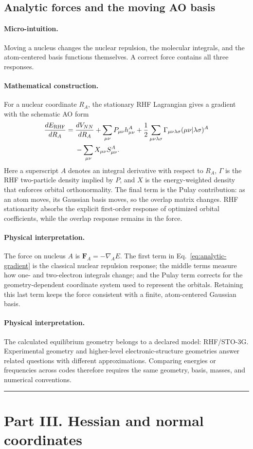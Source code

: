 \documentclass[10pt,twocolumn]{article}
\newcommand{\conceptbreak}{%
  \par\medskip\noindent
  {\color{black!30}\rule{\columnwidth}{0.35pt}}%
  \par\medskip}
\newcommand{\micro}{\paragraph{Micro-intuition.}}
\newcommand{\mathderiv}{\paragraph{Mathematical construction.}}
\newcommand{\physical}{\paragraph{Physical interpretation.}}
\begin{document}
\subsection*{Analytic forces and the moving AO basis}

\micro Moving a nucleus changes the nuclear repulsion, the molecular
integrals, and the atom-centered basis functions themselves.  A correct force
contains all three responses.

\mathderiv For a nuclear coordinate $R_A$, the stationary RHF Lagrangian gives
a gradient with the schematic AO form
\begin{align}
\frac{dE_{\rm RHF}}{dR_A}={}&\frac{dV_{NN}}{dR_A}
+\sum_{\mu\nu}P_{\mu\nu}h^{A}_{\mu\nu}
+\frac12\sum_{\mu\nu\lambda\sigma}
\Gamma_{\mu\nu\lambda\sigma}
(\mu\nu|\lambda\sigma)^{A}\nonumber\\
&-\sum_{\mu\nu}X_{\mu\nu}S^{A}_{\mu\nu}.
\label{eq:analytic-gradient}
\end{align}
Here a superscript $A$ denotes an integral derivative with respect to $R_A$,
$\Gamma$ is the RHF two-particle density implied by $P$, and $X$ is the
energy-weighted density that enforces orbital orthonormality.  The final term
is the Pulay contribution: as an atom moves, its Gaussian basis moves, so the
overlap matrix changes.  RHF stationarity absorbs the explicit first-order
response of optimized orbital coefficients, while the overlap response
remains in the force.

\physical The force on nucleus $A$ is
$\mathbf F_A=-\nabla_AE$.  The first term in
Eq.~\eqref{eq:analytic-gradient} is the classical nuclear repulsion response;
the middle terms measure how one- and two-electron integrals change; and the
Pulay term corrects for the geometry-dependent coordinate system used to
represent the orbitals.  Retaining this last term keeps the force consistent
with a finite, atom-centered Gaussian basis.

\physical The calculated equilibrium geometry belongs to a declared model:
RHF/STO-3G.  Experimental geometry and higher-level electronic-structure
geometries answer related questions with different approximations.  Comparing
energies or frequencies across codes therefore requires the same geometry,
basis, masses, and numerical conventions.

\conceptbreak

\section*{Part III. Hessian and normal coordinates}
\end{document}
